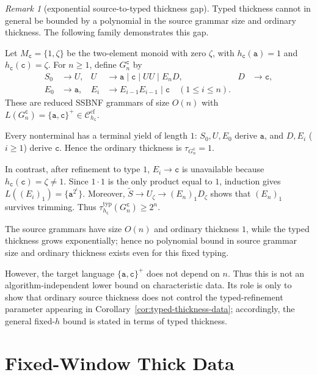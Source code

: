 \documentclass[11pt,a4paper]{article}
\theoremstyle{remark}
\newtheorem{remark}[theorem]{Remark}
\theoremstyle{plain}
\newcommand{\cf}{\mathrm{cf}}
\newcommand{\Ccf}[1]{\mathcal C_{#1}^{\cf}}
\begin{document}
\begin{remark}[exponential source-to-typed thickness gap]
\label{rem:typed-thickness-gap}
Typed thickness cannot in general be bounded by a polynomial in
the source grammar size and ordinary thickness.  The following
family demonstrates this gap.

Let $M_{\mathtt c}=\{1,\zeta\}$ be the two-element monoid with
zero $\zeta$, with $h_{\mathtt c}(\mathtt a)=1$ and
$h_{\mathtt c}(\mathtt c)=\zeta$.  For $n\ge1$, define
$G_n^{\mathtt c}$ by
\[
\begin{aligned}
 S_0&\to U, &
 U&\to \mathtt a\mid\mathtt c\mid UU\mid E_nD, &
 D&\to\mathtt c,\\
 E_0&\to\mathtt a, &
 E_i&\to E_{i-1}E_{i-1}\mid\mathtt c
 \quad(1\le i\le n).
\end{aligned}
\]
These are reduced SSBNF grammars of size $O(n)$ with
$L(G_n^{\mathtt c})=\{\mathtt a,\mathtt c\}^+
\in\Ccf{h_{\mathtt c}}$.

Every nonterminal has a terminal yield of length $1$:
$S_0,U,E_0$ derive $\mathtt a$, and
$D,E_i$ ($i\ge1$) derive $\mathtt c$.
Hence the ordinary thickness is $\tau_{G_n^{\mathtt c}}=1$.

In contrast, after refinement to type $1$,
$E_i\to\mathtt c$ is unavailable because
$h_{\mathtt c}(\mathtt c)=\zeta\ne1$.
Since $1\cdot1$ is the only product equal to $1$,
induction gives $L((E_i)_1)=\{\mathtt a^{2^i}\}$.
Moreover, $\widetilde S\to U_\zeta\to(E_n)_1D_\zeta$
shows that $(E_n)_1$ survives trimming.
Thus $\tau_{h_{\mathtt c}}^{\mathrm{typ}}(G_n^{\mathtt c})
\ge2^n$.

The source grammars have size $O(n)$ and ordinary thickness $1$,
while the typed thickness grows exponentially; hence no
polynomial bound in source grammar size and ordinary thickness
exists even for this fixed typing.

However, the target language $\{\mathtt a,\mathtt c\}^+$
does not depend on $n$.  Thus this is not an algorithm-independent lower bound
on characteristic data.  Its role is only to show that ordinary source
thickness does not control the typed-refinement parameter appearing in
Corollary~\ref{cor:typed-thickness-data}; accordingly, the general fixed-$h$
bound is stated in terms of typed thickness.
\end{remark}

\section{Fixed-Window Thick Data}
\label{sec:fixed-window-thick}
\end{document}
